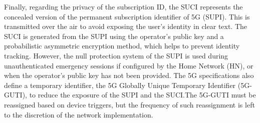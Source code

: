 \documentclass[english]{article}
\begin{document}
Finally, regarding the privacy of the subscription ID, the SUCI represents the
concealed version of the permanent subscription identifier of 5G (SUPI). This
is transmitted over the air to avoid exposing the user's identity in clear
text. The SUCI is generated from the SUPI using the operator's public key and a
probabilistic asymmetric encryption method, which helps to prevent identity
tracking. However, the null protection system of the SUPI is used during
unauthenticated emergency sessions if configured by the Home Network (HN), or
when the operator's public key has not been provided. The 5G specifications
also define a temporary identifier, the 5G Globally Unique Temporary Identifier
(5G-GUTI), to reduce the exposure of the SUPI and the SUCI.\@ The 5G-GUTI must
be reassigned based on device triggers, but the frequency of such reassignment
is left to the discretion of the network implementation.
\end{document}
